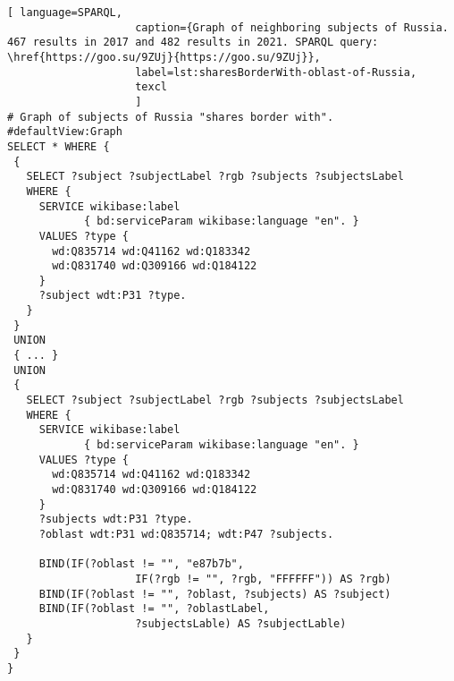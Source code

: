 \lstset{numbers=left, firstnumber=1, frame=single}
\begin{lstlisting}[ language=SPARQL, 
                    caption={Graph of neighboring subjects of Russia. 467 results in 2017 and 482 results in 2021. SPARQL query: \href{https://goo.su/9ZUj}{https://goo.su/9ZUj}},
                    label=lst:sharesBorderWith-oblast-of-Russia,
                    texcl 
                    ]
# Graph of subjects of Russia "shares border with". 
#defaultView:Graph
SELECT * WHERE {
 {
   SELECT ?subject ?subjectLabel ?rgb ?subjects ?subjectsLabel 
   WHERE {
     SERVICE wikibase:label 
            { bd:serviceParam wikibase:language "en". }
     VALUES ?type {
       wd:Q835714 wd:Q41162 wd:Q183342
       wd:Q831740 wd:Q309166 wd:Q184122
     }
     ?subject wdt:P31 ?type.
   }
 }
 UNION
 { ... }
 UNION
 {
   SELECT ?subject ?subjectLabel ?rgb ?subjects ?subjectsLabel 
   WHERE {
     SERVICE wikibase:label 
            { bd:serviceParam wikibase:language "en". }
     VALUES ?type {
       wd:Q835714 wd:Q41162 wd:Q183342
       wd:Q831740 wd:Q309166 wd:Q184122
     }
     ?subjects wdt:P31 ?type.
     ?oblast wdt:P31 wd:Q835714; wdt:P47 ?subjects.
     
     BIND(IF(?oblast != "", "e87b7b", 
                    IF(?rgb != "", ?rgb, "FFFFFF")) AS ?rgb)
     BIND(IF(?oblast != "", ?oblast, ?subjects) AS ?subject)
     BIND(IF(?oblast != "", ?oblastLabel, 
                    ?subjectsLable) AS ?subjectLable)
   }
 }
}
\end{lstlisting}%

\label{question:q_subjects_of_Russia_1}

